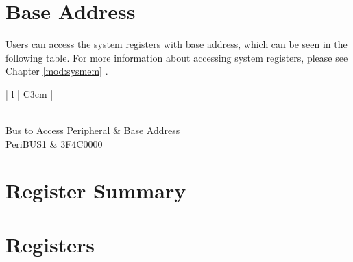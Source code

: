\documentclass[main\_\_EN.tex]{subfiles}
\begin{document}
\section{Base Address}\label{subsection:system-reg-base-address}

Users can access the system registers with base address, which can be seen in the following table. For more information about accessing system registers, please see Chapter \ref{mod:sysmem} \textit{}.

\begin{longtable}[c]{ | l | C{3cm} | }
\caption{System Register Base Address}\label{table:system-reg-base-address}
\\\hline
{}
    Bus to Access Peripheral & Base Address\\
    \hline
    PeriBUS1      & \hexprefix{}3F4C0000\\
    \hline
\end{longtable}

\hypertarget{sysreg-reg-summ}{}
\section{Register Summary}




\section{Registers}

\end{document}
